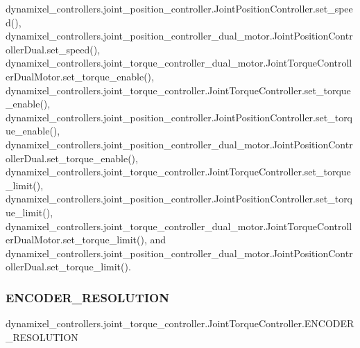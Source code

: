 dynamixel\+\_\+controllers.\+joint\+\_\+position\+\_\+controller.\+Joint\+Position\+Controller.\+set\+\_\+speed(), dynamixel\+\_\+controllers.\+joint\+\_\+position\+\_\+controller\+\_\+dual\+\_\+motor.\+Joint\+Position\+Controller\+Dual.\+set\+\_\+speed(), dynamixel\+\_\+controllers.\+joint\+\_\+torque\+\_\+controller\+\_\+dual\+\_\+motor.\+Joint\+Torque\+Controller\+Dual\+Motor.\+set\+\_\+torque\+\_\+enable(), dynamixel\+\_\+controllers.\+joint\+\_\+torque\+\_\+controller.\+Joint\+Torque\+Controller.\+set\+\_\+torque\+\_\+enable(), dynamixel\+\_\+controllers.\+joint\+\_\+position\+\_\+controller.\+Joint\+Position\+Controller.\+set\+\_\+torque\+\_\+enable(), dynamixel\+\_\+controllers.\+joint\+\_\+position\+\_\+controller\+\_\+dual\+\_\+motor.\+Joint\+Position\+Controller\+Dual.\+set\+\_\+torque\+\_\+enable(), dynamixel\+\_\+controllers.\+joint\+\_\+torque\+\_\+controller.\+Joint\+Torque\+Controller.\+set\+\_\+torque\+\_\+limit(), dynamixel\+\_\+controllers.\+joint\+\_\+position\+\_\+controller.\+Joint\+Position\+Controller.\+set\+\_\+torque\+\_\+limit(), dynamixel\+\_\+controllers.\+joint\+\_\+torque\+\_\+controller\+\_\+dual\+\_\+motor.\+Joint\+Torque\+Controller\+Dual\+Motor.\+set\+\_\+torque\+\_\+limit(), and dynamixel\+\_\+controllers.\+joint\+\_\+position\+\_\+controller\+\_\+dual\+\_\+motor.\+Joint\+Position\+Controller\+Dual.\+set\+\_\+torque\+\_\+limit().

\mbox{\label{classdynamixel__controllers_1_1joint__torque__controller_1_1_joint_torque_controller_a0c6146f0fbcfa14ccace2806a081d67d}} 
\subsubsection{\texorpdfstring{E\+N\+C\+O\+D\+E\+R\+\_\+\+R\+E\+S\+O\+L\+U\+T\+I\+ON}{ENCODER\_RESOLUTION}}
{\footnotesize\ttfamily dynamixel\+\_\+controllers.\+joint\+\_\+torque\+\_\+controller.\+Joint\+Torque\+Controller.\+E\+N\+C\+O\+D\+E\+R\+\_\+\+R\+E\+S\+O\+L\+U\+T\+I\+ON}



